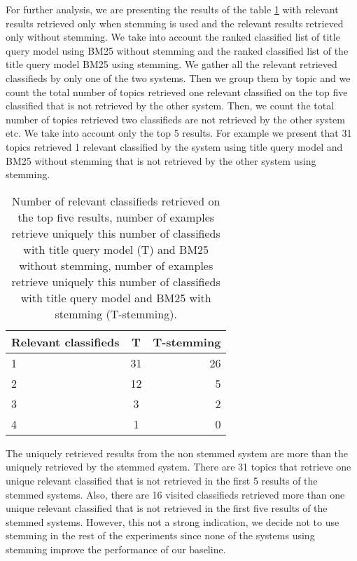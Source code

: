 For further analysis, we are presenting the results of the table \ref{table:stemmRelIrrel} with relevant results retrieved only when stemming is used and the relevant results retrieved only without stemming. We take into account the ranked classified list of title query model using BM25 without stemming and the ranked classified list of the title query model BM25 using stemming. We gather all the relevant retrieved classifieds by only one of the two systems. Then we group them by topic and we count the total number of topics retrieved one relevant classified on the top five classified that is not retrieved by the other system. Then, we count the total number of topics retrieved two classifieds are not retrieved by the other system etc. We take into account only the top 5 results. For example we present that 31 topics retrieved 1 relevant classified by the system using title query model and BM25 without stemming that is not retrieved by the other system using stemming.


\begin{table}[H]
\begin{center}
\caption{Number of relevant classifieds retrieved on the top five results, number of examples retrieve uniquely this number of classifieds with title query model (T) and BM25 without stemming, number of examples retrieve uniquely this number of classifieds with title query model and BM25 with stemming (T-stemming).}
\label{table:stemmRelIrrel}
\begin{tabular}{lcr}
\midrule
Relevant classifieds & T & T-stemming \\
\midrule
	1 & 31 & 26 \\
	2 & 12 & 5  \\
	3 & 3 & 2 \\
	4 & 1 & 0  \\
\bottomrule
\end{tabular}
\end{center}
\end{table}


The uniquely retrieved results from the non stemmed system are more than the uniquely retrieved by the stemmed system. There are 31 topics that retrieve one unique relevant classified that is not retrieved in the first 5 results of the stemmed systems. Also, there are 16 visited classifieds retrieved more than one unique relevant classified that is not retrieved in the first five results of the stemmed systems. However, this not a strong indication, we decide not to use stemming in the rest of the experiments since none of the systems using stemming improve the performance of our baseline.


